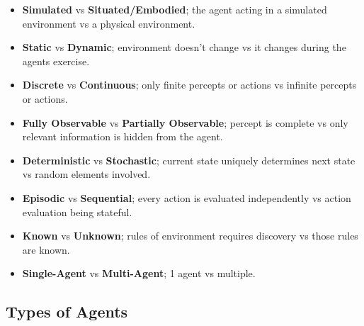 \documentclass{article}
\begin{document}
\begin{itemize}
	\item \textbf{Simulated} vs \textbf{Situated/Embodied}; the agent acting in a simulated environment vs a physical environment.
	\item \textbf{Static} vs \textbf{Dynamic}; environment doesn't change vs it changes during the agents exercise.
	\item \textbf{Discrete} vs \textbf{Continuous}; only finite percepts or actions vs infinite percepts or actions.
	\item \textbf{Fully Observable} vs \textbf{Partially Observable}; percept is complete vs only relevant information is hidden from the agent.
	\item \textbf{Deterministic} vs \textbf{Stochastic}; current state uniquely determines next state vs random elements involved.
	\item \textbf{Episodic} vs \textbf{Sequential}; every action is evaluated independently vs action evaluation being stateful.
	\item \textbf{Known} vs \textbf{Unknown}; rules of environment requires discovery vs those rules are known.
	\item \textbf{Single-Agent} vs \textbf{Multi-Agent}; 1 agent vs multiple.
\end{itemize}

\subsection{Types of Agents}
\end{document}

